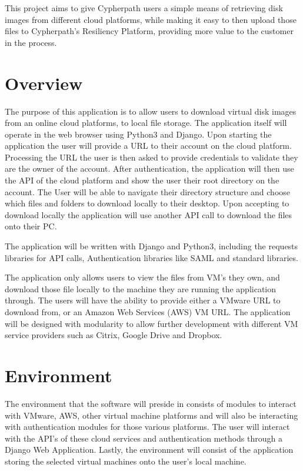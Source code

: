 \documentclass{article}
\begin{document}
	This project aims to give Cypherpath users a simple means of retrieving disk images from different cloud platforms, while making it easy to 
	then upload those files to Cypherpath's Resiliency Platform, providing more value to the customer in the process.


    \section{Overview}
    The purpose of this application is to allow users to download virtual disk images from an online cloud platforms, to local file storage.
    The application itself will operate in the web browser using Python3 and Django. Upon starting the application the user will
    provide a URL to their account on the cloud platform. Processing the URL the user is then asked to provide credentials to validate they are the owner of
    the account. After authentication, the application will then use the API of the cloud platform and show the user their root directory on the account.
    The User will be able to navigate their directory structure and choose which files and folders to download locally to their desktop.
    Upon accepting to download locally the application will use another API call to download the files onto their PC.

    The application will be written with Django and Python3, including the requests libraries for API calls, Authentication libraries like SAML
    and standard libraries.

    The application only allows users to view the files from VM's they own, and download those file locally to the machine they 
    are running the application through. The users will have the ability to provide either a VMware URL to download from, or an
    Amazon Web Services (AWS) VM URL. The application will be designed with modularity to allow further 
    development with different VM service providers such as Citrix, Google Drive and Dropbox.


    \section{Environment}
    The environment that the software will preside in consists of modules to interact with VMware, 
    AWS, other virtual machine platforms and will also be interacting with authentication modules for those
    various platforms. The user will interact with the API's of these cloud services and authentication
    methods through a Django Web Application. Lastly, the environment will consist of the application storing the selected
    virtual machines onto the user's local machine.
\end{document}
